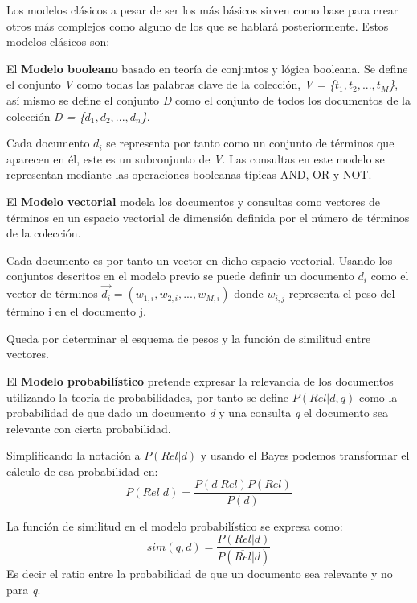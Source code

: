 Los modelos clásicos a pesar de ser los más básicos sirven como base para crear otros más complejos como alguno de los que se hablará posteriormente. Estos modelos clásicos son:\cite{RIspaBook}

\begin{list}{}{}
	\item  El \textbf{Modelo booleano} basado en teoría de conjuntos y lógica booleana. Se define el conjunto \textit{V} como todas las palabras clave de la colección, \textit{V = \{\(t_1, t_2, ..., t_M\)\}}, así mismo se define el conjunto \textit{D} como el conjunto de todos los documentos de la colección \textit{D = \{\(d_1, d_2, ..., d_n\)\}}. 
	
	Cada documento \(d_i\) se representa por tanto como un conjunto de términos que aparecen en él, este es un subconjunto de \textit{V}. Las consultas en este modelo se representan mediante las operaciones booleanas típicas AND, OR y NOT.
	
	\item El \textbf{Modelo vectorial} modela los documentos y consultas como vectores de términos en un espacio vectorial de dimensión definida por el número de términos de la colección. 
	
	Cada documento es por tanto un vector en dicho espacio vectorial. Usando los conjuntos descritos en el modelo previo se puede definir un documento \(d_i\) como el vector de términos \(\vec{d_i} = (w_{1,i}, w_{2,i}, ..., w_{M,i})\) donde \(w_{i,j}\) representa el peso del término i en el documento j.
	
	Queda por determinar el esquema de pesos y la función de similitud entre vectores.
	
	\item El \textbf{Modelo probabilístico} pretende expresar la relevancia de los documentos utilizando la teoría de probabilidades, por tanto se define \(P(Rel|d, q)\) como la probabilidad de que dado un documento \textit{d} y una consulta \textit{q} el documento sea relevante con cierta probabilidad. 
	
	Simplificando la notación a $P(Rel|d)$ y usando el \gls{Bayes} podemos transformar el cálculo de esa probabilidad en:
	\begin{equation}
	P(Rel|d) = \frac{P(d|Rel)P(Rel)}{P(d)}
	\end{equation}
	
	
	La función de similitud en el modelo probabilístico se expresa como:
	\begin{equation}
	sim(q,d) = \frac{P(Rel|d)}{P(\overline{Rel}|d)}
	\end{equation}
	Es decir el ratio entre la probabilidad de que un documento sea relevante y no para \textit{q}. 
	

\end{list}
